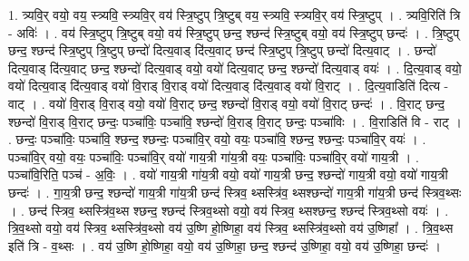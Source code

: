 \documentclass[17pt]{extarticle}
\begin{document}
1. त्र्यवि॒र् वयो॒ वय॒ स्त्र्यवि॒ स्त्र्यवि॒र् वय॑ स्त्रि॒ष्टुप् त्रि॒ष्टुब् वय॒ स्त्र्यवि॒ स्त्र्यवि॒र् वय॑ स्त्रि॒ष्टुप् । . त्र्यवि॒रिति॑ त्रि - अविः॑ । . वय॑ स्त्रि॒ष्टुप् त्रि॒ष्टुब् वयो॒ वय॑ स्त्रि॒ष्टुप् छन्द॒ श्छन्द॑ स्त्रि॒ष्टुब् वयो॒ वय॑ स्त्रि॒ष्टुप् छन्दः॑ । . त्रि॒ष्टुप् छन्द॒ श्छन्द॑ स्त्रि॒ष्टुप् त्रि॒ष्टुप् छन्दो॑ दित्य॒वाड् दि॑त्य॒वाट् छन्द॑ स्त्रि॒ष्टुप् त्रि॒ष्टुप् छन्दो॑ दित्य॒वाट् । . छन्दो॑ दित्य॒वाड् दि॑त्य॒वाट् छन्द॒ श्छन्दो॑ दित्य॒वाड् वयो॒ वयो॑ दित्य॒वाट् छन्द॒ श्छन्दो॑ दित्य॒वाड् वयः॑ । . दि॒त्य॒वाड् वयो॒ वयो॑ दित्य॒वाड् दि॑त्य॒वाड् वयो॑ वि॒राड् वि॒राड् वयो॑ दित्य॒वाड् दि॑त्य॒वाड् वयो॑ वि॒राट् । . दि॒त्य॒वाडिति॑ दित्य - वाट् । . वयो॑ वि॒राड् वि॒राड् वयो॒ वयो॑ वि॒राट् छन्द॒ श्छन्दो॑ वि॒राड् वयो॒ वयो॑ वि॒राट् छन्दः॑ । . वि॒राट् छन्द॒ श्छन्दो॑ वि॒राड् वि॒राट् छन्दः॒ पञ्चा॑विः॒ पञ्चा॑वि॒ श्छन्दो॑ वि॒राड् वि॒राट् छन्दः॒ पञ्चा॑विः । . वि॒राडिति॑ वि - राट् । . छन्दः॒ पञ्चा॑विः॒ पञ्चा॑वि॒ श्छन्द॒ श्छन्दः॒ पञ्चा॑वि॒र् वयो॒ वयः॒ पञ्चा॑वि॒ श्छन्द॒ श्छन्दः॒ पञ्चा॑वि॒र् वयः॑ । . पञ्चा॑वि॒र् वयो॒ वयः॒ पञ्चा॑विः॒ पञ्चा॑वि॒र् वयो॑ गाय॒त्री गा॑य॒त्री वयः॒ पञ्चा॑विः॒ पञ्चा॑वि॒र् वयो॑ गाय॒त्री । . पञ्चा॑वि॒रिति॒ पञ्च॑ - अ॒विः॒ । . वयो॑ गाय॒त्री गा॑य॒त्री वयो॒ वयो॑ गाय॒त्री छन्द॒ श्छन्दो॑ गाय॒त्री वयो॒ वयो॑ गाय॒त्री छन्दः॑ । . गा॒य॒त्री छन्द॒ श्छन्दो॑ गाय॒त्री गा॑य॒त्री छन्द॑ स्त्रिव॒ थ्सस्त्रि॑व॒ थ्सश्छन्दो॑ गाय॒त्री गा॑य॒त्री छन्द॑ स्त्रिव॒थ्सः । . छन्द॑ स्त्रिव॒ थ्सस्त्रि॑व॒थ्स श्छन्द॒ श्छन्द॑ स्त्रिव॒थ्सो वयो॒ वय॑ स्त्रिव॒ थ्सश्छन्द॒ श्छन्द॑ स्त्रिव॒थ्सो वयः॑ । . त्रि॒व॒थ्सो वयो॒ वय॑ स्त्रिव॒ थ्सस्त्रि॑व॒थ्सो वय॑ उ॒ष्णि हो॒ष्णिहा॒ वय॑ स्त्रिव॒ थ्सस्त्रि॑व॒थ्सो वय॑ उ॒ष्णिहा᳚ । . त्रि॒व॒थ्स इति॑ त्रि - व॒थ्सः । . वय॑ उ॒ष्णि हो॒ष्णिहा॒ वयो॒ वय॑ उ॒ष्णिहा॒ छन्द॒ श्छन्द॑ उ॒ष्णिहा॒ वयो॒ वय॑ उ॒ष्णिहा॒ छन्दः॑ । \newline
\end{document}
